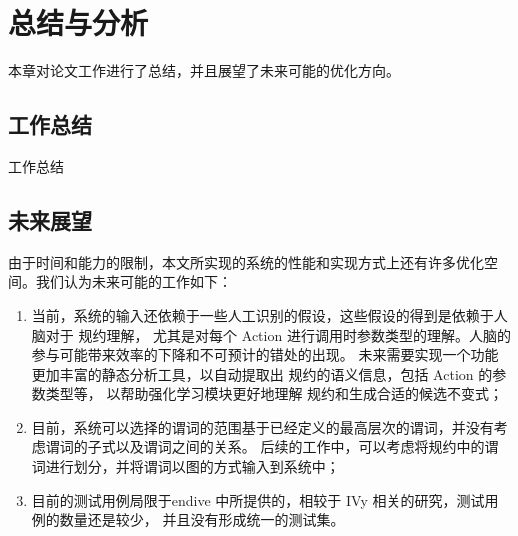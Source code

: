 \chapter{总结与分析}
本章对论文工作进行了总结，并且展望了未来可能的优化方向。
\section{工作总结}
工作总结
\section{未来展望}
由于时间和能力的限制，本文所实现的系统的性能和实现方式上还有许多优化空间。我们认为未来可能的工作如下：
\begin{enumerate}
    \item 当前，系统的输入还依赖于一些人工识别的假设，这些假设的得到是依赖于人脑对于 \TLA 规约理解，
    尤其是对每个 Action 进行调用时参数类型的理解。人脑的参与可能带来效率的下降和不可预计的错处的出现。
    未来需要实现一个功能更加丰富的静态分析工具，以自动提取出 \TLA 规约的语义信息，包括 Action 的参数类型等，
    以帮助强化学习模块更好地理解 \TLA 规约和生成合适的候选不变式；
    \item 目前，系统可以选择的谓词的范围基于\TLA 已经定义的最高层次的谓词，并没有考虑谓词的子式以及谓词之间的关系。
    后续的工作中，可以考虑将\TLA 规约中的谓词进行划分，并将谓词以图的方式输入到系统中；
    \item 目前的测试用例局限于endive 中所提供的，相较于 IVy 相关的研究，测试用例的数量还是较少，
    并且没有形成统一的测试集。
\end{enumerate}